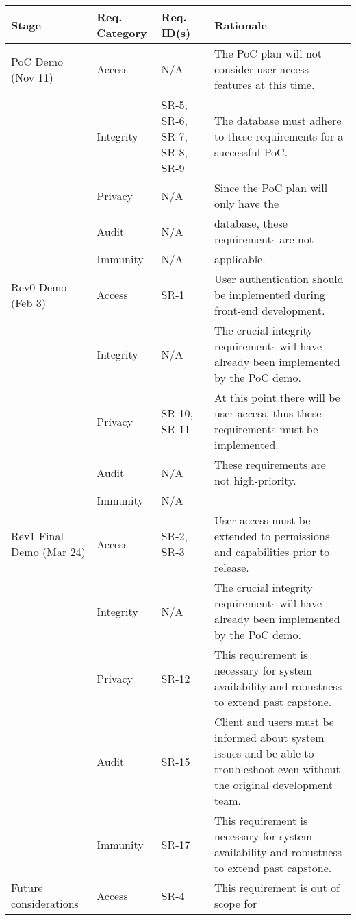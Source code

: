 \documentclass{article}
\begin{document}
\begin{longtable}[c]{|m{2cm}|m{2.6cm}|m{2.6cm}|m{5.8cm}|}
    \hline
    \textbf{Stage} & \textbf{Req. Category} & \textbf{Req. ID(s)} &
    \textbf{Rationale} \\
    \hline
    \endhead
    PoC Demo (Nov 11) & Access & N/A & The PoC plan will not consider user
    access features at this time.\\
    \cline{2-4}
    & Integrity & SR-5, SR-6, SR-7, SR-8, SR-9 & The database must adhere to
    these requirements for a successful PoC.\\
    \cline{2-4}
    & Privacy & N/A & Since the PoC plan will only have the\\
    & Audit & N/A & database, these requirements are not\\
    & Immunity & N/A & applicable.\\
    \hline
    Rev0 Demo (Feb 3) & Access & SR-1 & User authentication should be
    implemented during front-end development.\\
    \cline{2-4}
    & Integrity & N/A & The crucial integrity requirements will have already
    been implemented by the PoC demo.\\
    \cline{2-4}
    & Privacy & SR-10, SR-11 & At this point there will be user access, thus
    these requirements must be implemented.\\
    \cline{2-4}
    & Audit & N/A & These requirements are not high-priority.\\
    & Immunity & N/A & \\
    \hline
    Rev1 Final Demo (Mar 24) & Access & SR-2, SR-3 & User access must be
    extended to permissions and capabilities prior to release.\\
    \cline{2-4}
    & Integrity & N/A & The crucial integrity requirements will have already
    been implemented by the PoC demo.\\
    \cline{2-4}
    & Privacy & SR-12 & This requirement is necessary for system availability
    and robustness to extend past capstone.\\
    \cline{2-4}
    & Audit & SR-15 & Client and users must be informed about system issues and
    be able to troubleshoot even without the original development team.\\
    \cline{2-4}
    & Immunity & SR-17 & This requirement is necessary for system availability
    and robustness to extend past capstone.\\
    \hline
    Future considerations & Access & SR-4 & This requirement is out of scope for

\end{longtable}
\end{document}
